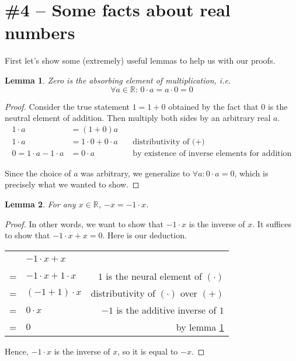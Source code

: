 \documentclass[letterpaper,11pt]{article}
\newcommand{\R}{\mathbb{R}}
\newtheorem{lemma}{Lemma}
\begin{document}
\section*{\#4 -- Some facts about real numbers}

First let's show some (extremely) useful lemmas to help us with our proofs.

\begin{lemma}
    Zero is the absorbing element of multiplication, i.e.
    \begin{equation*}
        \forall a \in \R:\, 0 \cdot a = a \cdot 0 = 0
    \end{equation*}
    \label{lem:zeroabsorb}
\end{lemma}

\begin{proof}
    Consider the true statement $1 = 1 + 0$ obtained by the fact that $0$ is
    the neutral element of addition. Then multiply both sides by an arbitrary
    real $a$.
    \begin{align*}
        1 \cdot a &= (1 + 0)a & ~ \\
        1 \cdot a &= 1 \cdot 0 + 0 \cdot a
            & \quad\text{distributivity of (+)} \\
        0 = 1 \cdot a - 1 \cdot a &= 0 \cdot a
            & \quad\text{by existence of inverse elements for addition}
    \end{align*}

    Since the choice of $a$ was arbitrary, we generalize to
    $\forall a: 0 \cdot a = 0$, which is precisely what we wanted to show.
\end{proof}

\begin{lemma}
    For any $x \in \R$, $-x = -1 \cdot x$.
    \label{lem:minusone}
\end{lemma}

\begin{proof}
    In other words, we want to show that $-1 \cdot x$ is the inverse of $x$. It
    suffices to show that $-1 \cdot x + x = 0$. Here is our deduction.

    \begin{center}
        \begin{tabular}{r l | r}
            ~ & $-1 \cdot x + x$ & ~ \\
            = & $-1 \cdot x + 1 \cdot x$
                & $1$ is the neural element of $(\cdot)$ \\
            = & $(-1 + 1) \cdot x$ & distributivity of $(\cdot)$ over $(+)$ \\
            = & $0 \cdot x$ & $-1$ is the additive inverse of $1$ \\
            = & $0$ & by lemma \ref{lem:zeroabsorb}
        \end{tabular}
    \end{center}

    Hence, $-1 \cdot x$ is the inverse of $x$, so it is equal to $-x$.
\end{proof}
\end{document}
